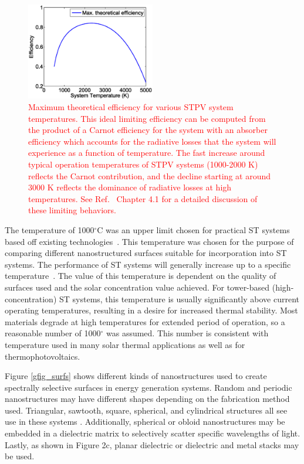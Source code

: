 \documentclass[review]{elsarticle}
\begin{document}
\begin{figure}[ht!]
\begin{center}
        \includegraphics[width=0.5\textwidth]{ideal_STPV_eff}
        \caption{\label{Ideal} \textcolor{red}{Maximum theoretical efficiency for various STPV system temperatures.  This ideal limiting
efficiency can be computed from the product of a Carnot efficiency for the system 
with an absorber efficiency which accounts for the 
radiative losses that the system will experience as a function of temperature.  The fast increase
around typical operation temperatures of STPV systems (1000-2000 K) reflects the Carnot contribution, and the decline
starting at around 3000 K reflects the dominance of radiative losses at high temperatures.  See Ref.~\cite{me_thesis}
Chapter 4.1 for a detailed discussion of these limiting behaviors.}}
\end{center}
\end{figure}

The temperature of 1000$^\circ$C was an upper limit chosen for practical ST systems based off existing 
technologies~\cite{RKR_RenEnRev_2013, g2}.  This temperature was chosen for the purpose of comparing different nanostructured 
surfaces suitable for incorporation into ST systems.  The performance of ST systems will generally 
increase up to a specific temperature~\cite{MS_EnConvMan_2012}.  The value of this temperature is dependent on the 
quality of surfaces used and the solar concentration value achieved.  For tower-based (high-concentration) 
ST systems, this temperature is usually significantly above current operating temperatures, resulting in a 
desire for increased thermal stability. Most materials degrade at high temperatures for extended period of 
operation, so a reasonable number of 1000$^{\circ}$ was assumed. This number is consistent with temperature used in 
many solar thermal applications as well as for thermophotovoltaics.

Figure \ref{gfig_surfs} shows different kinds of nanostructures used to create spectrally selective surfaces in energy generation systems.  Random and periodic nanostructures may have different shapes depending on the fabrication method used.  Triangular, sawtooth, square, spherical, and cylindrical structures all see use in these systems \cite{global_opt,paper2_ref6,RF_OptExp_2009}.  Additionally, spherical or obloid nanostructures may be embedded in a dielectric matrix to selectively scatter specific wavelengths of light.  Lastly, as shown in Figure 2c, planar dielectric or dielectric and metal stacks may be used.
\end{document}

